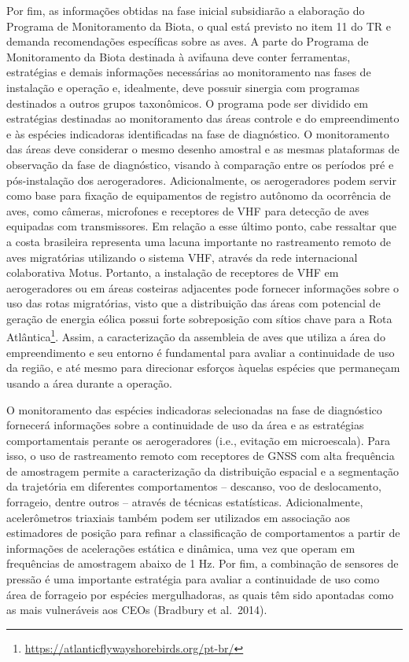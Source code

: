 \documentclass[
  oneside]{scrbook}
\DeclareRobustCommand{\href}[2]{#2\footnote{\url{#1}}}
\begin{document}
Por fim, as informações obtidas na fase inicial subsidiarão a elaboração do Programa de Monitoramento da Biota, o qual está previsto no item 11 do TR e demanda recomendações específicas sobre as aves. A parte do Programa de Monitoramento da Biota destinada à avifauna deve conter ferramentas, estratégias e demais informações necessárias ao monitoramento nas fases de instalação e operação e, idealmente, deve possuir sinergia com programas destinados a outros grupos taxonômicos. O programa pode ser dividido em estratégias destinadas ao monitoramento das áreas controle e do empreendimento e às espécies indicadoras identificadas na fase de diagnóstico. O monitoramento das áreas deve considerar o mesmo desenho amostral e as mesmas plataformas de observação da fase de diagnóstico, visando à comparação entre os períodos pré e pós-instalação dos aerogeradores. Adicionalmente, os aerogeradores podem servir como base para fixação de equipamentos de registro autônomo da ocorrência de aves, como câmeras, microfones e receptores de VHF para detecção de aves equipadas com transmissores. Em relação a esse último ponto, cabe ressaltar que a costa brasileira representa uma lacuna importante no rastreamento remoto de aves migratórias utilizando o sistema VHF, através da rede internacional colaborativa Motus. Portanto, a instalação de receptores de VHF em aerogeradores ou em áreas costeiras adjacentes pode fornecer informações sobre o uso das rotas migratórias, visto que a distribuição das áreas com potencial de geração de energia eólica possui forte sobreposição com sítios chave para a \href{https://atlanticflywayshorebirds.org/pt-br/}{Rota Atlântica}. Assim, a caracterização da assembleia de aves que utiliza a área do empreendimento e seu entorno é fundamental para avaliar a continuidade de uso da região, e até mesmo para direcionar esforços àquelas espécies que permaneçam usando a área durante a operação.

O monitoramento das espécies indicadoras selecionadas na fase de diagnóstico fornecerá informações sobre a continuidade de uso da área e as estratégias comportamentais perante os aerogeradores (i.e., evitação em microescala). Para isso, o uso de rastreamento remoto com receptores de GNSS com alta frequência de amostragem permite a caracterização da distribuição espacial e a segmentação da trajetória em diferentes comportamentos -- descanso, voo de deslocamento, forrageio, dentre outros -- através de técnicas estatísticas. Adicionalmente, acelerômetros triaxiais também podem ser utilizados em associação aos estimadores de posição para refinar a classificação de comportamentos a partir de informações de acelerações estática e dinâmica, uma vez que operam em frequências de amostragem abaixo de 1 Hz. Por fim, a combinação de sensores de pressão é uma importante estratégia para avaliar a continuidade de uso como área de forrageio por espécies mergulhadoras, as quais têm sido apontadas como as mais vulneráveis aos CEOs (Bradbury et al.~2014).
\end{document}
